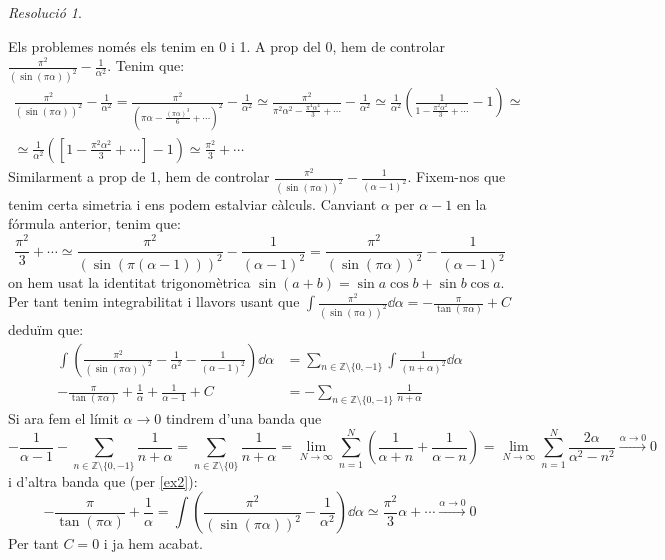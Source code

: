 \documentclass[10pt,a4paper]{article}
\newcommand{\ZZ}{\ensuremath{\mathbb{Z}}} %
\theoremstyle{definition}
\theoremstyle{remark}
\newtheorem*{res}{Resolució}
\begin{document}
\begin{res}
\begin{enumerate}
          Els problemes només els tenim en 0 i 1. A prop del 0, hem de controlar $\frac{\pi^2}{{(\sin(\pi\alpha))}^2}-\frac{1}{\alpha^2}$. Tenim que:
          \begin{multline}\label{ex2}
            \frac{\pi^2}{{(\sin(\pi\alpha))}^2}-\frac{1}{\alpha^2}= \frac{\pi^2}{{(\pi\alpha-\frac{{(\pi\alpha)}^3}{6}+\cdots)}^2}-\frac{1}{\alpha^2}\simeq \frac{\pi^2}{\pi^2\alpha^2-\frac{\pi^4\alpha^4}{3}+\cdots}-\frac{1}{\alpha^2}\simeq \frac{1}{\alpha^2}\left(\frac{1}{1-\frac{\pi^2\alpha^2}{3}+\cdots}-1\right)\simeq \\\simeq \frac{1}{\alpha^2}\left(\left[1-\frac{\pi^2\alpha^2}{3}+\cdots\right]-1\right)\simeq \frac{\pi^2}{3}+\cdots
          \end{multline}
          Similarment a prop de 1, hem de controlar $\frac{\pi^2}{{(\sin(\pi\alpha))}^2}-\frac{1}{{(\alpha-1)}^2}$. Fixem-nos que tenim certa simetria i ens podem estalviar càlculs. Canviant $\alpha$ per $\alpha-1$ en la fórmula anterior, tenim que:
          $$\frac{\pi^2}{3}+\cdots\simeq\frac{\pi^2}{{(\sin(\pi(\alpha-1)))}^2}-\frac{1}{{(\alpha-1)}^2}=\frac{\pi^2}{{(\sin(\pi\alpha))}^2}-\frac{1}{{(\alpha-1)}^2}$$
          on hem usat la identitat trigonomètrica $\sin(a+b)=\sin{a}\cos{b}+\sin{b}\cos{a}$. Per tant tenim integrabilitat i llavors usant que $\int\frac{\pi^2}{{(\sin(\pi\alpha))}^2}\dd{\alpha}=-\frac{\pi}{\tan(\pi\alpha)}+C$ deduïm que:
          \begin{align*}
            \int\left(\frac{\pi^2}{{(\sin(\pi\alpha))}^2}-\frac{1}{\alpha^2}-\frac{1}{{(\alpha-1)^2}}\right)\dd{\alpha} & =\sum_{n\in\ZZ\setminus\{0,-1\}}\int\frac{1}{{(n+\alpha)}^2}\dd{\alpha} \\
            -\frac{\pi}{\tan(\pi\alpha)}+\frac{1}{\alpha}+\frac{1}{\alpha-1}+C                                          & =-\sum_{n\in\ZZ\setminus\{0,-1\}}\frac{1}{n+\alpha}
          \end{align*}
          Si ara fem el límit $\alpha\to0$ tindrem d'una banda que $$-\frac{1}{\alpha-1}-\sum_{n\in\ZZ\setminus\{0,-1\}}\frac{1}{n+\alpha}=\sum_{n\in\ZZ\setminus\{0\}}\frac{1}{n+\alpha}=\lim_{N\to\infty}\sum_{n=1}^{N}\left(\frac{1}{\alpha+n}+\frac{1}{\alpha-n}\right)=\lim_{N\to\infty}\sum_{n=1}^{N}\frac{2\alpha}{\alpha^2-n^2}\overset{\alpha\to 0}{\longrightarrow}0$$ i d'altra banda que (per \eqref{ex2}):
          $$-\frac{\pi}{\tan(\pi\alpha)}+\frac{1}{\alpha}=\int\left(\frac{\pi^2}{{(\sin(\pi\alpha))}^2}-\frac{1}{\alpha^2}\right)\dd{\alpha}\simeq\frac{\pi^2}{3}\alpha+\cdots\overset{\alpha\to 0}{\longrightarrow}0$$
          Per tant $C=0$ i ja hem acabat.
  \end{enumerate}
\end{res}
\end{document}
